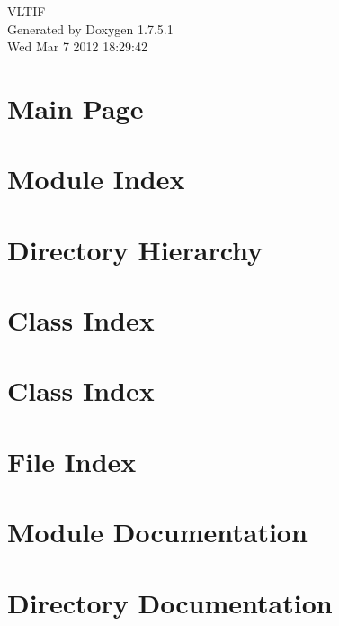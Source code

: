 \documentclass[a4paper]{book}
\begin{document}
\hypersetup{pageanchor=false,citecolor=blue}
\begin{titlepage}
\vspace*{7cm}
\begin{center}
{\Large \-V\-L\-T\-I\-F }\\
\vspace*{1cm}
{\large \-Generated by Doxygen 1.7.5.1}\\
\vspace*{0.5cm}
{\small Wed Mar 7 2012 18:29:42}\\
\end{center}
\end{titlepage}
\clearemptydoublepage
{}
\tableofcontents
\clearemptydoublepage
{}
\hypersetup{pageanchor=true,citecolor=blue}
\chapter{\-Main \-Page}
\label{index}\hypertarget{index}{}
\chapter{\-Module \-Index}

\chapter{\-Directory \-Hierarchy}

\chapter{\-Class \-Index}

\chapter{\-Class \-Index}

\chapter{\-File \-Index}

\chapter{\-Module \-Documentation}




\chapter{\-Directory \-Documentation}





\end{document}
